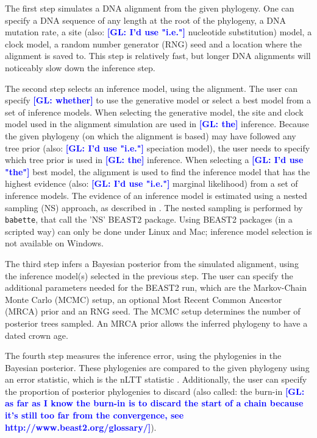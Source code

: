 \documentclass{article}
\newcommand{\giovanni}[1]{\textcolor{blue}{\textbf{[GL: #1]}}}
\begin{document}
The first step simulates a DNA alignment from the given phylogeny.
One can specify a DNA sequence
of any length at the root of the phylogeny, a DNA mutation rate, a
site (also: \giovanni{I'd use "i.e."} nucleotide substitution) model, 
a clock model, a random number generator (RNG) seed and a location
where the alignment is saved to. This step is relatively fast, but longer
DNA alignments will noticeably slow down the inference step.

The second step selects an inference model, using the alignment.
The user can specify \giovanni{whether} to use the generative model or select a best model
from a set of inference models. 
When selecting the generative model,
the site and clock model used in the alignment simulation are used
in \giovanni{the} inference. Because the given phylogeny (on which the alignment is based)
may have followed any tree prior (also: \giovanni{I'd use "i.e."} speciation model), the user needs
to specify which tree prior is used in \giovanni{the} inference. 
When selecting a \giovanni{I'd use "the"} best
model, the alignment is used to find the inference model that has the
highest evidence (also: \giovanni{I'd use "i.e."} marginal likelihood) from a set of inference models.
The evidence of an inference model is estimated using a nested sampling (NS)
approach, as described in \cite{maturana2018model}. The nested sampling is
performed by \verb;babette;, that call the 'NS' BEAST2 package. 
Using BEAST2 packages (in a scripted way) can only be done under Linux and Mac; inference model selection is not available on Windows.

The third step infers a Bayesian posterior from the simulated alignment,
using the inference model(s) selected in the previous step. The user
can specify the additional parameters needed for the BEAST2 run, which
are the Markov-Chain Monte Carlo (MCMC) setup, 
an optional Most Recent Common Ancestor (MRCA) prior and an RNG seed.
The MCMC setup determines the number of posterior trees sampled.
An MRCA prior allows the inferred phylogeny to have a dated crown age.

The fourth step measures the inference error, using the phylogenies in the
Bayesian posterior. These phylogenies are compared to the given
phylogeny using an error statistic, which is the nLTT 
statistic \cite{janzen2015approximate}. Additionally, the user can specify the
proportion of posterior phylogenies to discard (also called: the burn-in \giovanni{as far as I know the burn-in is to discard the start of a chain because it's still too far from the convergence, see http://www.beast2.org/glossary/}).
\end{document}
